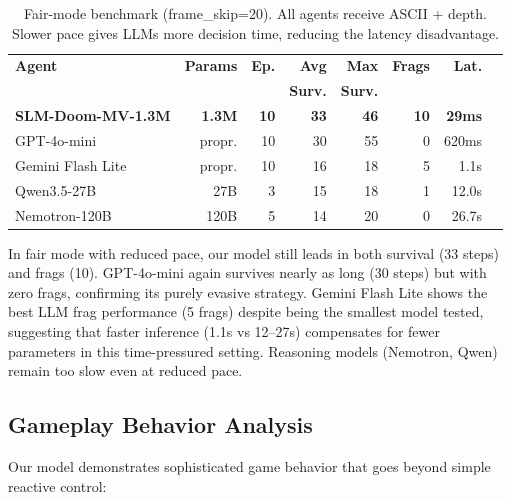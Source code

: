 \documentclass[11pt,a4paper]{article}
\begin{document}
\begin{table}[h]
\centering
\caption{Fair-mode benchmark (frame\_skip=20). All agents receive ASCII + depth. Slower pace gives LLMs more decision time, reducing the latency disadvantage.}
\label{tab:fairmode}
\begin{tabular}{lrrrrrrr}
\toprule
\textbf{Agent} & \textbf{Params} & \textbf{Ep.} & \textbf{Avg} & \textbf{Max} & \textbf{Frags} & \textbf{Lat.} \\
 & & & \textbf{Surv.} & \textbf{Surv.} & & \\
\midrule
\textbf{SLM-Doom-MV-1.3M} & \textbf{1.3M} & \textbf{10} & \textbf{33} & \textbf{46} & \textbf{10} & \textbf{29ms} \\
GPT-4o-mini & propr. & 10 & 30 & 55 & 0 & 620ms \\
Gemini Flash Lite & propr. & 10 & 16 & 18 & 5 & 1.1s \\
Qwen3.5-27B & 27B & 3 & 15 & 18 & 1 & 12.0s \\
Nemotron-120B & 120B & 5 & 14 & 20 & 0 & 26.7s \\
\bottomrule
\end{tabular}
\end{table}

In fair mode with reduced pace, our model still leads in both survival (33 steps) and frags (10). GPT-4o-mini again survives nearly as long (30 steps) but with zero frags, confirming its purely evasive strategy. Gemini Flash Lite shows the best LLM frag performance (5 frags) despite being the smallest model tested, suggesting that faster inference (1.1s vs 12--27s) compensates for fewer parameters in this time-pressured setting. Reasoning models (Nemotron, Qwen) remain too slow even at reduced pace.

\subsection{Gameplay Behavior Analysis}

Our model demonstrates sophisticated game behavior that goes beyond simple reactive control:
\end{document}
